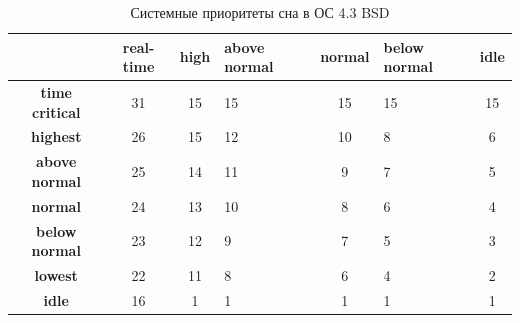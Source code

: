 \begin{table}[h]
	\caption{Системные приоритеты сна в ОС 4.3 BSD}
	\begin{center}
		\begin{tabular}{| c | c | c | p{45pt} | c | p{45pt} | c |} 
			\hline
			& \textbf{real-time} & \textbf{high} & \textbf{above normal} & \textbf{normal} & \textbf{below normal} & \textbf{idle} \\
			\hline
			\textbf{time critical} & 31 & 15 & 15 & 15 & 15 & 15 \\
			\hline
			\textbf{highest} & 26 & 15 & 12 & 10 & 8 & 6 \\
			\hline
			\textbf{above normal} & 25 & 14 & 11 & 9 & 7 & 5 \\
			\hline
			\textbf{normal} & 24 & 13 & 10 & 8 & 6 & 4 \\
			\hline
			\textbf{below normal} & 23 & 12 & 9 & 7 & 5 & 3 \\
			\hline
			\textbf{lowest} & 22 & 11 & 8 & 6 & 4 & 2 \\
			\hline
			\textbf{idle} & 16 & 1 & 1 & 1 & 1 & 1 \\
			\hline
		\end{tabular}
	\end{center}
\end{table}


